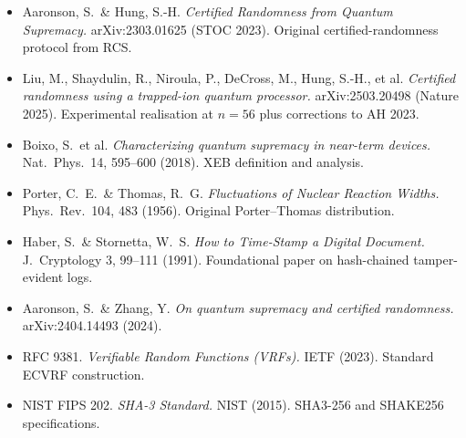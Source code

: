 \documentclass[11pt,a4paper]{article}
\theoremstyle{plain}
\theoremstyle{definition}
\theoremstyle{remark}
\begin{document}
\begin{itemize}[itemsep=4pt,topsep=4pt]
  \item Aaronson, S.\ \& Hung, S.-H. \textit{Certified Randomness from Quantum Supremacy.} arXiv:2303.01625 (STOC 2023). Original certified-randomness protocol from RCS.

  \item Liu, M., Shaydulin, R., Niroula, P., DeCross, M., Hung, S.-H., et al. \textit{Certified randomness using a trapped-ion quantum processor.} arXiv:2503.20498 (Nature 2025). Experimental realisation at $n=56$ plus corrections to AH 2023.

  \item Boixo, S.\ et al. \textit{Characterizing quantum supremacy in near-term devices.} Nat.\ Phys.\ 14, 595--600 (2018). XEB definition and analysis.

  \item Porter, C.\ E.\ \& Thomas, R.\ G. \textit{Fluctuations of Nuclear Reaction Widths.} Phys.\ Rev.\ 104, 483 (1956). Original Porter--Thomas distribution.

  \item Haber, S.\ \& Stornetta, W.\ S. \textit{How to Time-Stamp a Digital Document.} J.\ Cryptology 3, 99--111 (1991). Foundational paper on hash-chained tamper-evident logs.

  \item Aaronson, S.\ \& Zhang, Y. \textit{On quantum supremacy and certified randomness.} arXiv:2404.14493 (2024).

  \item RFC 9381. \textit{Verifiable Random Functions (VRFs).} IETF (2023). Standard ECVRF construction.

  \item NIST FIPS 202. \textit{SHA-3 Standard.} NIST (2015). SHA3-256 and SHAKE256 specifications.
\end{itemize}
\end{document}
